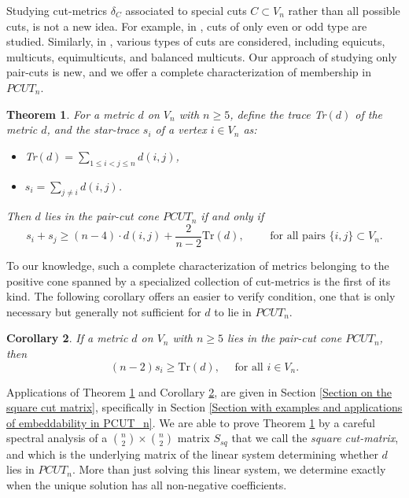 \documentclass[12pt]{amsart}
\newtheorem{theorem}{Theorem}
\numberwithin{theorem}{section}
\newtheorem{corollary}[theorem]{Corollary}
\theoremstyle{remark}
\begin{document}
Studying cut-metrics $\delta_C$ associated to special cuts $C\subset V_n$ rather than all possible cuts, is not a new idea. For example, in \cite{DezaLaurant3}, cuts of only even or odd type are studied. Similarly, in \cite{DezaLaurantGrotschel}, various types of cuts are considered, including equicuts, multicuts, equimulticuts, and balanced multicuts. Our approach of studying only pair-cuts is new, and we offer a complete characterization of membership in  $PCUT_n$. 
\begin{theorem} \label{Main theorem stated in the introduction}
For a metric $d$ on $V_n$ with $n\ge 5$, define the trace Tr$(d)$ of the metric $d$, and the star-trace $s_i$ of a vertex $i\in V_n$ as:  
\begin{itemize}
	\item[(i)] Tr$(d) = \sum _{1\le i<j\le n} d(i,j)$, 
	\vskip2mm
	\item[(ii)] $s_i = \sum_{j\ne i} d(i,j)$.  
\end{itemize}
Then $d$ lies in the pair-cut cone $PCUT_n$ if and only if 
%
\begin{equation} \label{Main inequality for the coordinates of wsq to be nonnegative from the introduction}
	s_i + s_j\ge (n-4)\cdot d(i,j) + \frac{2}{n-2}\text{Tr}(d), \qquad \text{ for all pairs } \{i, j\} \subset V_n. 
\end{equation}
\end{theorem} 
To our knowledge, such a complete characterization of metrics belonging to the positive cone spanned by a specialized collection of cut-metrics is the first of its kind. The following corollary offers an easier to verify condition, one that is only necessary but generally not sufficient for $d$ to lie in $PCUT_n$. 
\begin{corollary} \label{Corollary with main ineqaulity for PCUTn membership stated in the introduction}
	If a metric $d$ on $V_n$ with $n\ge 5$ lies in the pair-cut cone $PCUT_n$, then 
	\begin{equation} \label{Secondary inequality on star-traces and traces of metrics in the pair-cut-cone}
		(n-2)s_i \ge  \text{Tr}(d), \quad \text{ for all } i\in V_n. 
	\end{equation}
\end{corollary}
Applications of Theorem \ref{Main theorem stated in the introduction} and Corollary \ref{Corollary with main ineqaulity for PCUTn membership stated in the introduction}, are given in Section \ref{Section on the square cut matrix}, specifically in Section \ref{Section with examples and applications of embeddability in PCUT_n}. We are able to prove Theorem \ref{Main theorem stated in the introduction} by a careful spectral analysis of a ${n\choose 2}\times {n \choose 2}$ matrix $S_{sq}$ that we call the {\em square cut-matrix}, and which is the underlying matrix of the linear system determining whether $d$ lies in $PCUT_n$. More than just solving this linear system, we determine exactly when the unique solution has all non-negative coefficients. 
\end{document}
